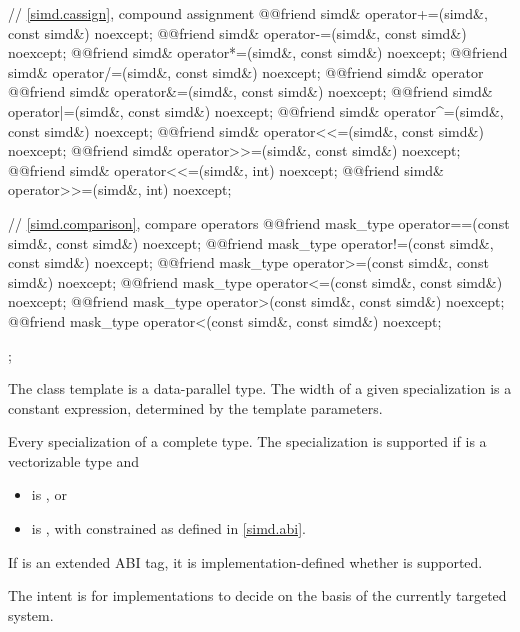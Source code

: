 \begin{codeblock}
{  // \ref{simd.cassign},  compound assignment
  @@friend simd& operator+=(simd&, const simd&) noexcept;
  @@friend simd& operator-=(simd&, const simd&) noexcept;
  @@friend simd& operator*=(simd&, const simd&) noexcept;
  @@friend simd& operator/=(simd&, const simd&) noexcept;
  @@friend simd& operator%
  @@friend simd& operator&=(simd&, const simd&) noexcept;
  @@friend simd& operator|=(simd&, const simd&) noexcept;
  @@friend simd& operator^=(simd&, const simd&) noexcept;
  @@friend simd& operator<<=(simd&, const simd&) noexcept;
  @@friend simd& operator>>=(simd&, const simd&) noexcept;
  @@friend simd& operator<<=(simd&, int) noexcept;
  @@friend simd& operator>>=(simd&, int) noexcept;

  // \ref{simd.comparison},  compare operators
  @@friend mask_type operator==(const simd&, const simd&) noexcept;
  @@friend mask_type operator!=(const simd&, const simd&) noexcept;
  @@friend mask_type operator>=(const simd&, const simd&) noexcept;
  @@friend mask_type operator<=(const simd&, const simd&) noexcept;
  @@friend mask_type operator>(const simd&, const simd&) noexcept;
  @@friend mask_type operator<(const simd&, const simd&) noexcept;
};
\end{codeblock}

\pnum
The class template  is a data-parallel type. The width of a given  specialization is a constant expression, determined by the template parameters.

\pnum
Every specialization of   a complete type. The specialization  is supported if  is a vectorizable type and
\begin{itemize}
  \item {} is , or
  \item {} is , with  constrained as defined in \ref{simd.abi}.
\end{itemize}

If  is an extended ABI tag, it is implementation-defined whether  is supported. \begin{note}The intent is for implementations to decide on the basis of the currently targeted system.\end{note}

